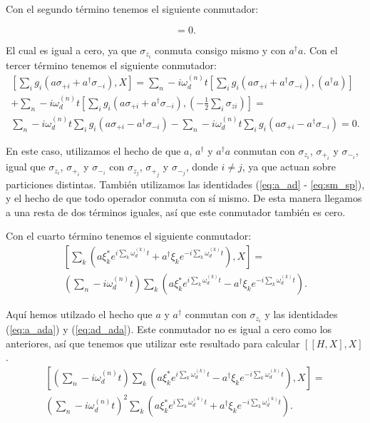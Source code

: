 Con el segundo término tenemos el siguiente conmutador:

\begin{equation}
    [- \frac{1}{2} \sum\limits_i \omega_{qi} \sigma_{zi} , X] = 0 .
\end{equation}

El cual es igual a cero, ya que $\sigma_{z_i}$ conmuta consigo mismo y con $a^\dagger a$. Con el tercer término tenemos el siguiente conmutador:
\begin{multline}
\left[\sum\limits_i g_i (a \sigma_{+ i} + a^\dagger \sigma_{- i}), X\right] = 
\sum\limits_n-i \omega_d^{(n)} t \left[\sum\limits_i g_i (a \sigma_{+ i} + a^\dagger \sigma_{- i}), (a^\dagger a)\right] \\
+ \sum\limits_n-i \omega_d^{(n)} t \left[\sum\limits_i g_i (a \sigma_{+ i} + a^\dagger \sigma_{- i}), (- \frac{1}{2} \sum\limits_i \sigma_{z i})\right] = \\
\sum\limits_n-i \omega_d^{(n)} t \sum\limits_i g_i (a \sigma_{+ i} - a^\dagger \sigma_{- i})
- \sum\limits_n-i \omega_d^{(n)} t \sum\limits_i g_i (a \sigma_{+ i} - a^\dagger \sigma_{- i}) = 0 .
\end{multline}

En este caso, utilizamos el hecho de que $a$, $a^\dagger$ y $a^\dagger a$ conmutan con $\sigma_{z_i}$, $\sigma_{+_i}$ y $\sigma_{-_i}$, igual que $\sigma_{z_i}$, $\sigma_{+_i}$ y $\sigma_{-_i}$ con $\sigma_{z_j}$, $\sigma_{+_j}$ y $\sigma_{-_j}$, donde $i \neq j$, ya que actuan sobre particiones distintas. También utilizamos las identidades (\ref{eq:a_ad} - \ref{eq:sm_sp}), y el hecho de que todo operador conmuta con sí mismo. De esta manera llegamos a una resta de dos términos iguales, así que este conmutador también es cero.

Con el cuarto término tenemos el siguiente conmutador:
\begin{multline}
    \left[\sum\limits_k \left(a\xi_k^*e^{i\sum\limits_k \omega_d^{(k)}t}+ a^\dagger\xi_ke^{-i\sum\limits_k \omega_d^{(k)}t}\right), X\right] = \\
    \left(\sum\limits_n-i \omega_d^{(n)} t\right) \sum\limits_k \left(a\xi_k^*e^{i\sum\limits_k \omega_d^{(k)}t} - a^\dagger\xi_ke^{-i\sum\limits_k \omega_d^{(k)}t}\right) .
\end{multline}

Aquí hemos utilzado el hecho que $a$ y $a^\dagger$ conmutan con $\sigma_{z_i}$ y las identidades (\ref{eq:a_ada}) y (\ref{eq:ad_ada}). Este conmutador no es igual a cero como los anteriores, así que tenemos que utilizar este resultado para calcular $[[H,X],X]$.
\begin{multline}
    \left[\left(\sum\limits_n-i \omega_d^{(n)} t\right) \sum\limits_k \left(a\xi_k^*e^{i\sum\limits_k \omega_d^{(k)}t} - a^\dagger\xi_ke^{-i\sum\limits_k \omega_d^{(k)}t}\right), X\right] = \\
    \left(\sum\limits_n-i \omega_d^{(n)} t\right)^2 \sum\limits_k \left(a\xi_k^*e^{i\sum\limits_k \omega_d^{(k)}t} + a^\dagger\xi_ke^{-i\sum\limits_k \omega_d^{(k)}t}\right) .
\end{multline}
 
